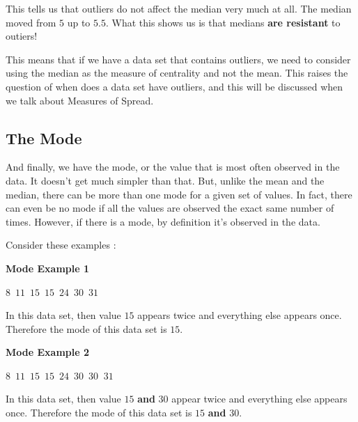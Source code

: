 \documentclass[
  letterpaper,
  DIV=11,
  numbers=noendperiod]{scrreprt}
\begin{document}
This tells us that outliers do not affect the median very much at all.
The median moved from \(5\) up to \(5.5\). What this shows us is that
medians \textbf{are resistant} to outiers!

\begin{tcolorbox}[enhanced jigsaw, breakable, arc=.35mm, leftrule=.75mm, toprule=.15mm, titlerule=0mm, coltitle=black, colframe=quarto-callout-important-color-frame, left=2mm, opacitybacktitle=0.6, rightrule=.15mm, bottomrule=.15mm, colback=white, toptitle=1mm, opacityback=0, title=\textcolor{quarto-callout-important-color}{\faExclamation}\hspace{0.5em}{Important}, bottomtitle=1mm, colbacktitle=quarto-callout-important-color!10!white]

This means that if we have a data set that contains outliers, we need to
consider using the median as the measure of centrality and not the mean.
This raises the question of when does a data set have outliers, and this
will be discussed when we talk about Measures of Spread.

\end{tcolorbox}

\subsection*{The Mode}\label{the-mode}

And finally, we have the mode, or the value that is most often observed
in the data. It doesn't get much simpler than that. But, unlike the mean
and the median, there can be more than one mode for a given set of
values. In fact, there can even be no mode if all the values are
observed the exact same number of times. However, if there is a mode, by
definition it's observed in the data.

Consider these examples :

\textbf{Mode Example 1}

\(8\,\,\, 11\,\,\,  15\,\,\,  15\,\,\,  24\,\,\,  30\,\,\,  31\)

In this data set, then value \(15\) appears twice and everything else
appears once. Therefore the mode of this data set is \(15\).

\textbf{Mode Example 2}

\(8\,\,\, 11\,\,\,  15\,\,\,  15\,\,\,  24\,\,\,  30\,\,\,  30\,\,\ 31\)

In this data set, then value \(15\) \textbf{and} \(30\) appear twice and
everything else appears once. Therefore the mode of this data set is
\(15\) \textbf{and} \(30\).
\end{document}
